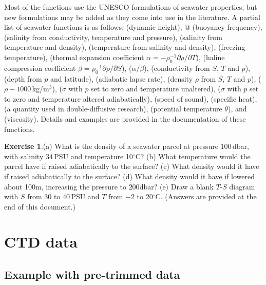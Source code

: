 \documentclass{article}
\newcommand{\workedexercise}[2]{
	\vspace{2ex plus 2ex minus 1ex}
	\begin{boxedminipage}[c]{0.95\linewidth}
		{\textbf{Exercise #1}.\hspace{1em}#2}
	\end{boxedminipage}
	\vspace{2ex plus 2ex minus 1ex}
}
\begin{document}
Most of the functions use the UNESCO formulations of seawater properties, but new formulations
may be added as they come into use in the literature.
A partial list of seawater functions is as follows:
\verb@swDynamicHeight@ (dynamic height),
@ (buoyancy frequency),
\verb@swSCTp@ (salinity from conductivity, temperature and pressure),
\verb@swSTrho@ (salinity from temperature and density),
\verb@swTSrho@ (temperature from salinity and density),
\verb@swTFreeze@ (freezing temperature),
\verb@swAlpha@ (thermal expansion coefficient $\alpha=-\rho_0^{-1}\partial\rho/\partial T$),
\verb@swBeta@ (haline compression coefficient $\beta=\rho_0^{-1}\partial\rho/\partial S$),
\verb@swAlphaOverBeta@ ($\alpha/\beta$),
\verb@swConductivity@ (conductivity from $S$, $T$ and $p$),
\verb@swDepth@ (depth from $p$ and latitude),
\verb@swLapseRate@ (adiabatic lapse rate),
\verb@swRho@ (density $\rho$ from $S$, $T$ and $p$),
\verb@swSigma@ ($\rho-1000$\,kg/m$^3$),
\verb@swSigmaT@ ($\sigma$ with $p$ set to zero and temperature unaltered),
\verb@swSigmaTheta@ ($\sigma$ with $p$ set to zero and temperature altered adiabatically),
\verb@swSoundSpeed@ (speed of sound),
\verb@swSpecificHeat@ (specific heat),
\verb@swSpice@ (a quantity used in double-diffusive research),
\verb@swTheta@ (potential temperature $\theta$),
and
\verb@swViscosity@ (viscosity).
Details and examples are provided in the documentation of these functions.


\workedexercise{1}{(a) What is the density of a seawater parcel at pressure
$100$\,dbar, with salinity $34$\,PSU and temperature 10$^\circ$C?
(b) What temperature would the parcel have if raised adiabatically to the surface?
(c) What density would it have if raised adiabatically to the surface?
(d) What density would it have if lowered about 100m, increasing the pressure to $200$dbar?
(e) Draw a blank $T$-$S$ diagram with $S$ from $30$ to $40$\,PSU and $T$ from $-2$ to 20$^\circ$C.
(Answers are provided at the end of this document.)
}


\section{CTD data}
\subsection{Example with pre-trimmed data}

\end{document}
